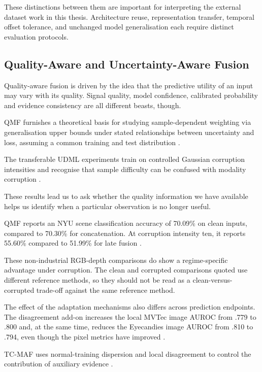 These distinctions between them are important for interpreting the external dataset work in this
thesis. Architecture reuse, representation transfer, temporal offset tolerance, and unchanged model
generalisation each require distinct evaluation protocols.

\subsection{Quality-Aware and Uncertainty-Aware Fusion}

Quality-aware fusion is driven by the idea that the predictive utility of an input may vary with its
quality. Signal quality, model confidence, calibrated probability and evidence consistency are all
different beasts, though.

QMF furnishes a theoretical basis for studying sample-dependent weighting via generalisation upper
bounds under stated relationships between uncertainty and loss, assuming a common training and test
distribution \parencite[Sections~3.1--3.2]{Zhang2023QMF}.

The transferable UDML experiments train on controlled Gaussian corruption intensities and recognise
that sample difficulty can be confused with modality corruption \parencite[PDF pp.~4--5, 9]{P022}.

These results lead us to ask whether the quality information we have available helps us identify
when a particular observation is no longer useful.

QMF reports an NYU scene classification accuracy of 70.09\% on clean inputs, compared to 70.30\% for
concatenation. At corruption intensity ten, it reports 55.60\% compared to 51.99\% for late fusion
\parencite[PDF p.~8, Table~1]{Zhang2023QMF}.

These non-industrial RGB-depth comparisons do show a regime-specific advantage under corruption. The
clean and corrupted comparisons quoted use different reference methods, so they should not be read
as a clean-versus-corrupted trade-off against the same reference method.

The effect of the adaptation mechanisms also differs across prediction endpoints. The disagreement
add-on increases the local MVTec image AUROC from .779 to .800 and, at the same time, reduces the
Eyecandies image AUROC from .810 to .794, even though the pixel metrics have improved \parencite[PDF
pp.~10--11, Tables~4--5]{P033}.

TC-MAF uses normal-training dispersion and local disagreement to control the contribution of
auxiliary evidence \parencite{P026}.

